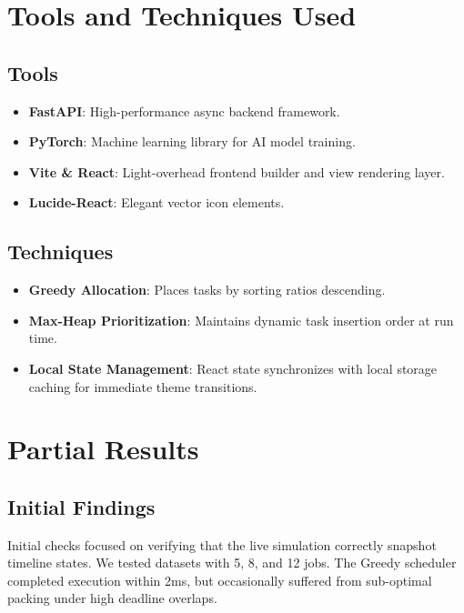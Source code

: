\documentclass[12pt,a4paper]{article}
\begin{document}
\section{Tools and Techniques Used}

\subsection{Tools}
\begin{itemize}
    \item \textbf{FastAPI}: High-performance async backend framework.
    \item \textbf{PyTorch}: Machine learning library for AI model training.
    \item \textbf{Vite \& React}: Light-overhead frontend builder and view rendering layer.
    \item \textbf{Lucide-React}: Elegant vector icon elements.
\end{itemize}

\subsection{Techniques}
\begin{itemize}
    \item \textbf{Greedy Allocation}: Places tasks by sorting ratios descending.
    \item \textbf{Max-Heap Prioritization}: Maintains dynamic task insertion order at run time.
    \item \textbf{Local State Management}: React state synchronizes with local storage caching for immediate theme transitions.
\end{itemize}


\section{Partial Results}

\subsection{Initial Findings}
Initial checks focused on verifying that the live simulation correctly snapshot timeline states. We tested datasets with 5, 8, and 12 jobs. The Greedy scheduler completed execution within 2ms, but occasionally suffered from sub-optimal packing under high deadline overlaps.
\end{document}

